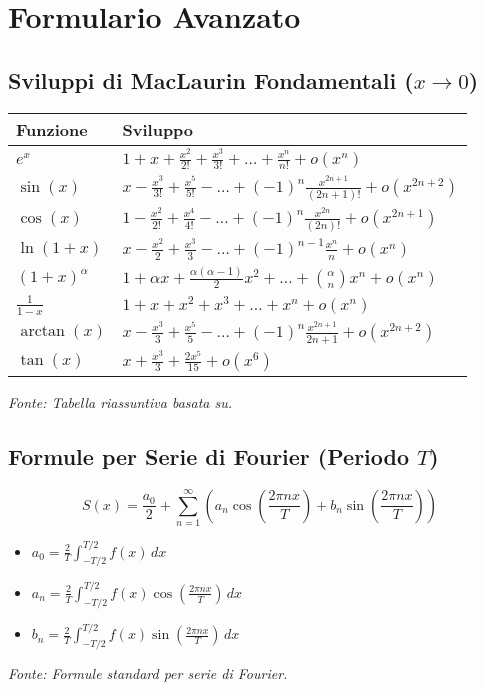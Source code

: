 \documentclass[a4paper, 12pt]{article}
\begin{document}


\appendix
\section{Formulario Avanzato}

\subsection{Sviluppi di MacLaurin Fondamentali (\texorpdfstring{$x \to 0$}{per x che tende a 0})}
\begin{center}
\begin{tabular}{ll}
\toprule
\textbf{Funzione} & \textbf{Sviluppo} \\
\midrule
$e^x$ & $1 + x + \frac{x^2}{2!} + \frac{x^3}{3!} + \dots + \frac{x^n}{n!} + o(x^n)$ \\ [1ex]
$\sin(x)$ & $x - \frac{x^3}{3!} + \frac{x^5}{5!} - \dots + (-1)^n \frac{x^{2n+1}}{(2n+1)!} + o(x^{2n+2})$ \\ [1ex]
$\cos(x)$ & $1 - \frac{x^2}{2!} + \frac{x^4}{4!} - \dots + (-1)^n \frac{x^{2n}}{(2n)!} + o(x^{2n+1})$ \\ [1ex]
$\ln(1+x)$ & $x - \frac{x^2}{2} + \frac{x^3}{3} - \dots + (-1)^{n-1} \frac{x^n}{n} + o(x^n)$ \\ [1ex]
$(1+x)^\alpha$ & $1 + \alpha x + \frac{\alpha(\alpha-1)}{2}x^2 + \dots + \binom{\alpha}{n}x^n + o(x^n)$ \\ [1ex]
$\frac{1}{1-x}$ & $1 + x + x^2 + x^3 + \dots + x^n + o(x^n)$ \\ [1ex]
$\arctan(x)$ & $x - \frac{x^3}{3} + \frac{x^5}{5} - \dots + (-1)^n \frac{x^{2n+1}}{2n+1} + o(x^{2n+2})$ \\ [1ex]
$\tan(x)$ & $x + \frac{x^3}{3} + \frac{2x^5}{15} + o(x^6)$ \\
\bottomrule
\end{tabular}
\end{center}
\vspace{1em}
\textit{Fonte: Tabella riassuntiva basata su.}


\subsection{Formule per Serie di Fourier (Periodo \texorpdfstring{$T$}{T})}
\[ S(x) = \frac{a_0}{2} + \sum_{n=1}^\infty \left( a_n \cos\left(\frac{2\pi n x}{T}\right) + b_n \sin\left(\frac{2\pi n x}{T}\right) \right) \]
\begin{itemize}
    \item $a_0 = \frac{2}{T} \int_{-T/2}^{T/2} f(x) \, dx$
    \item $a_n = \frac{2}{T} \int_{-T/2}^{T/2} f(x) \cos\left(\frac{2\pi n x}{T}\right) \, dx$
    \item $b_n = \frac{2}{T} \int_{-T/2}^{T/2} f(x) \sin\left(\frac{2\pi n x}{T}\right) \, dx$
\end{itemize}
\vspace{1em}
\textit{Fonte: Formule standard per serie di Fourier.}
\end{document}
